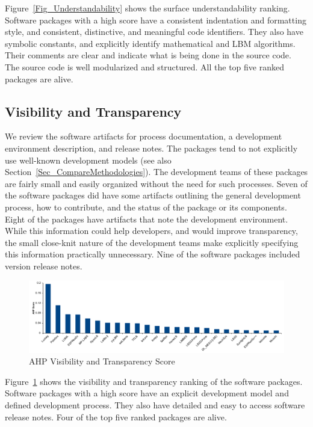 \documentclass[final, 3p, times, authoryear]{elsarticle}
\begin{document}
Figure~\ref{Fig_Understandability} shows the surface understandability ranking.
Software packages with a high score have a consistent indentation and formatting
style, and consistent, distinctive, and meaningful code identifiers. They also
have symbolic constants, and explicitly identify mathematical and LBM
algorithms. Their comments are clear and indicate what is being done in the
source code. The source code is well modularized and structured. All the top
five ranked packages are alive.

\subsection{Visibility and Transparency}

We review the software artifacts for process documentation, a development
environment description, and release notes.  The packages tend to not explicitly
use well-known development models (see also
Section~\ref{Sec_CompareMethodologies}). The development teams of these packages
are fairly small and easily organized without the need for such processes. Seven
of the software packages did have some artifacts outlining the general
development process, how to contribute, and the status of the package or its
components. Eight of the packages have artifacts that note the development
environment. While this information could help developers, and would improve
transparency, the small close-knit nature of the development teams make
explicitly specifying this information practically unnecessary. Nine of the
software packages included version release notes.

\begin{figure}[h!]
	\begin{center}
		\includegraphics[width=1.0\textwidth]{./figures/visibilitytransparency_chart.pdf}
		\caption{AHP Visibility and Transparency Score}
		\label{Fig_VisibilityTransparency}
	\end{center}
\end{figure}

Figure~\ref{Fig_VisibilityTransparency} shows the visibility and transparency
ranking of the software packages. Software packages with a high score have an
explicit development model and defined development process. They also have
detailed and easy to access software release notes. Four of the top five ranked
packages are alive.
\end{document}
